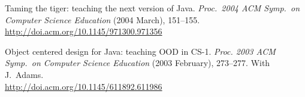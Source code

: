 \documentclass[ComputerScience]{vita}
\newcommand{\duphref}[1]{\href{#1}{#1}}
\begin{document}
\begin{vita}
\begin{Publications}
\begin{Papers at Refereed Conferences}
	\item Taming the tiger: teaching the next version of Java.  \textit{Proc.\ 2004 ACM Symp.\ on Computer Science Education} (2004 March), 151--155.  \\\duphref{http://doi.acm.org/10.1145/971300.971356}


  \item Object centered design for Java: teaching OOD in CS-1. \textit{Proc. 2003 ACM Symp.\ on Computer Science Education} (2003 February), 273--277.  With J.\ Adams.  \\\duphref{http://doi.acm.org/10.1145/611892.611986}



  \end{Papers at Refereed Conferences}





\end{Publications}
\end{vita}
\end{document}
